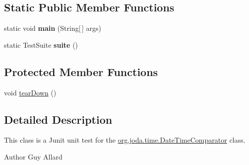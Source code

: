 \subsection*{Static Public Member Functions}
\begin{DoxyCompactItemize}
\item 
\hypertarget{classorg_1_1joda_1_1time_1_1_test_date_time_comparator_af1f7d672d6ddaf04ecad88be99fb4208}{static void {\bfseries main} (String\mbox{[}$\,$\mbox{]} args)}\label{classorg_1_1joda_1_1time_1_1_test_date_time_comparator_af1f7d672d6ddaf04ecad88be99fb4208}

\item 
\hypertarget{classorg_1_1joda_1_1time_1_1_test_date_time_comparator_aeb9abd577ec4de0e97bae843232dc120}{static Test\-Suite {\bfseries suite} ()}\label{classorg_1_1joda_1_1time_1_1_test_date_time_comparator_aeb9abd577ec4de0e97bae843232dc120}

\end{DoxyCompactItemize}
\subsection*{Protected Member Functions}
\begin{DoxyCompactItemize}
\item 
void \hyperlink{classorg_1_1joda_1_1time_1_1_test_date_time_comparator_aed4574e00637110a7b063f88cd01c1ca}{tear\-Down} ()
\end{DoxyCompactItemize}


\subsection{Detailed Description}
This class is a Junit unit test for the \hyperlink{classorg_1_1joda_1_1time_1_1_date_time_comparator}{org.\-joda.\-time.\-Date\-Time\-Comparator} class.

\begin{DoxyAuthor}{Author}
Guy Allard 
\end{DoxyAuthor}


